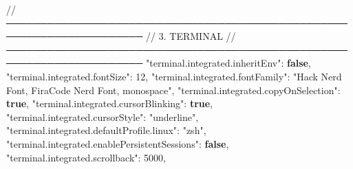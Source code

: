 \documentclass[
  doc,
  floatsintext,
  longtable,
  a4paper,
  nolmodern,
  notxfonts,
  notimes,
  12pt,
  colorlinks=true,linkcolor=blue,citecolor=blue,urlcolor=blue]{apa7}
\newenvironment{Shaded}{\begin{snugshade}}{\end{snugshade}}
\newcommand{\DataTypeTok}[1]{\textcolor[rgb]{0.68,0.00,0.00}{#1}}
\newcommand{\DecValTok}[1]{\textcolor[rgb]{0.68,0.00,0.00}{#1}}
\newcommand{\ErrorTok}[1]{\textcolor[rgb]{0.68,0.00,0.00}{#1}}
\newcommand{\FunctionTok}[1]{\textcolor[rgb]{0.28,0.35,0.67}{#1}}
\newcommand{\KeywordTok}[1]{\textcolor[rgb]{0.00,0.23,0.31}{\textbf{#1}}}
\newcommand{\StringTok}[1]{\textcolor[rgb]{0.13,0.47,0.30}{#1}}
\begin{document}
\begin{Shaded}
\begin{Highlighting}[]
  \ErrorTok{//} \ErrorTok{──────────────────────────────────────────────────────────────────────}
  \ErrorTok{//} \ErrorTok{3.} \ErrorTok{TERMINAL}
  \ErrorTok{//} \ErrorTok{──────────────────────────────────────────────────────────────────────}
  \DataTypeTok{"terminal.integrated.inheritEnv"}\FunctionTok{:} \KeywordTok{false}\FunctionTok{,}
  \DataTypeTok{"terminal.integrated.fontSize"}\FunctionTok{:} \DecValTok{12}\FunctionTok{,}
  \DataTypeTok{"terminal.integrated.fontFamily"}\FunctionTok{:} \StringTok{"\textquotesingle{}Hack Nerd Font\textquotesingle{}, \textquotesingle{}FiraCode Nerd Font\textquotesingle{}, monospace"}\FunctionTok{,}
  \DataTypeTok{"terminal.integrated.copyOnSelection"}\FunctionTok{:} \KeywordTok{true}\FunctionTok{,}
  \DataTypeTok{"terminal.integrated.cursorBlinking"}\FunctionTok{:} \KeywordTok{true}\FunctionTok{,}
  \DataTypeTok{"terminal.integrated.cursorStyle"}\FunctionTok{:} \StringTok{"underline"}\FunctionTok{,}
  \DataTypeTok{"terminal.integrated.defaultProfile.linux"}\FunctionTok{:} \StringTok{"zsh"}\FunctionTok{,}
  \DataTypeTok{"terminal.integrated.enablePersistentSessions"}\FunctionTok{:} \KeywordTok{false}\FunctionTok{,}
  \DataTypeTok{"terminal.integrated.scrollback"}\FunctionTok{:} \DecValTok{5000}\FunctionTok{,}


\end{Highlighting}
\end{Shaded}
\end{document}
